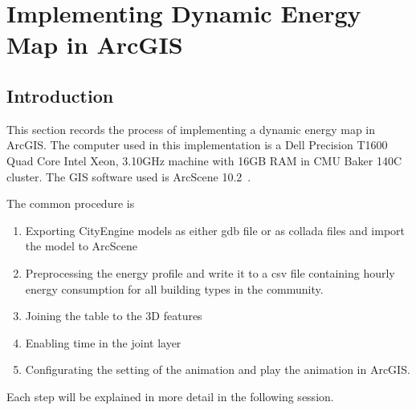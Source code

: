 
\chapter{Implementing Dynamic Energy Map in
  ArcGIS} %

\label{AppendixC} %

\section{Introduction}
This section records the process of implementing a dynamic energy map
in ArcGIS. The computer used in this implementation is a Dell
Precision T1600 Quad Core Intel Xeon, 3.10GHz machine with 16GB RAM in
CMU Baker 140C cluster. The GIS software used is ArcScene
10.2~\cite{arcScene2015}.

The common procedure is 
\begin{enumerate}[{Step }1]
\item Exporting CityEngine models as either gdb file or as collada
  files and import the model to ArcScene
\item Preprocessing the energy profile and write it to a csv file
  containing hourly energy consumption for all building types in the
  community.
\item Joining the table to the 3D features
\item Enabling time in the joint layer
\item Configurating the setting of the animation and play
the animation in ArcGIS.
\end{enumerate}
Each step will be explained in more detail in the following session.
